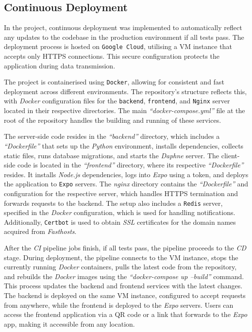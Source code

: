 \subsection{Continuous Deployment}

In the project, continuous deployment was implemented to automatically reflect any updates to the codebase in the production environment if all tests pass. The deployment process is hosted on \texttt{Google Cloud}, utilising a VM instance that accepts only HTTPS connections. This secure configuration protects the application during data transmission.

The project is containerised using \texttt{Docker}, allowing for consistent and fast deployment across different environments. The repository's structure reflects this, with \textit{Docker} configuration files for the \texttt{backend}, \texttt{frontend}, and \texttt{Nginx} server located in their respective directories. The main \textit{``docker-compose.yml''} file at the root of the repository handles the building and running of these services.

The server-side code resides in the \textit{``backend''} directory, which includes a \textit{``Dockerfile''} that sets up the \textit{Python} environment, installs dependencies, collects static files, runs database migrations, and starts the \textit{Daphne} server. The client-side code is located in the \textit{``frontend''} directory, where its respective \textit{``Dockerfile''} resides. It installs \textit{Node.js} dependencies, logs into \textit{Expo} using a token, and deploys the application to \texttt{Expo} servers. The \textit{nginx} directory contains the \textit{``Dockerfile''} and configuration for the respective server, which handles HTTPS termination and forwards requests to the backend. The setup also includes a \texttt{Redis} server, specified in the \textit{Docker} configuration, which is used for handling notifications. Additionally, \texttt{Certbot} is used to obtain \textit{SSL} certificates for the domain names acquired from \textit{Fasthosts}.

After the \textit{CI} pipeline jobs finish, if all tests pass, the pipeline proceeds to the \textit{CD} stage. During deployment, the pipeline connects to the VM instance, stops the currently running \textit{Docker} containers, pulls the latest code from the repository, and rebuilds the \textit{Docker} images using the \textit{``docker-compose up --build''} command. This process updates the backend and frontend services with the latest changes. The backend is deployed on the same VM instance, configured to accept requests from anywhere, while the frontend is deployed to the \textit{Expo} servers. Users can access the frontend application via a QR code or a link that forwards to the \textit{Expo} app, making it accessible from any location.

